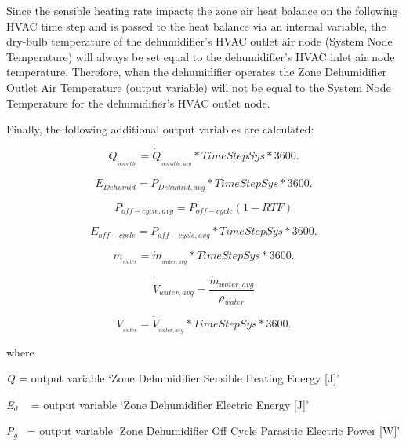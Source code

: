Since the sensible heating rate impacts the zone air heat balance on the following HVAC time step and is passed to the heat balance via an internal variable, the dry-bulb temperature of the dehumidifier's HVAC outlet air node (System Node Temperature) will always be set equal to the dehumidifier's HVAC inlet air node temperature. Therefore, when the dehumidifier operates the Zone Dehumidifier Outlet Air Temperature (output variable) will not be equal to the System Node Temperature for the dehumidifier's HVAC outlet node.

Finally, the following additional output variables are calculated:

\begin{equation}
{Q_{_{sensible}}} = {\dot Q_{_{sensible,avg}}}*TimeStepSys*3600.
\end{equation}

\begin{equation}
{E_{Dehumid}} = {P_{Dehumid,avg}}*TimeStepSys*3600.
\end{equation}

\begin{equation}
{P_{off - cycle,avg}} = {P_{off - cycle}}\left( {1 - RTF} \right)
\end{equation}

\begin{equation}
{E_{off - cycle}} = {P_{off - cycle,avg}}*TimeStepSys*3600.
\end{equation}

\begin{equation}
{m_{_{water}}} = {\dot m_{_{water,avg}}}*TimeStepSys*3600.
\end{equation}

\begin{equation}
\dot{V}_{water,avg} = \frac{\dot{m}_{water,avg}}{\rho_{water}}
\end{equation}

\begin{equation}
{V_{_{water}}} = {\dot V_{_{water,avg}}}*TimeStepSys*3600.
\end{equation}

where

\emph{Q\(_{ }\)} = output variable `Zone Dehumidifier Sensible Heating Energy {[}J{]}'

\emph{E\(_{d}\)} ~ = output variable `Zone Dehumidifier Electric Energy {[}J{]}'

\emph{P\(_{g}\)}~ = output variable `Zone Dehumidifier Off Cycle Parasitic Electric Power {[}W{]}'

